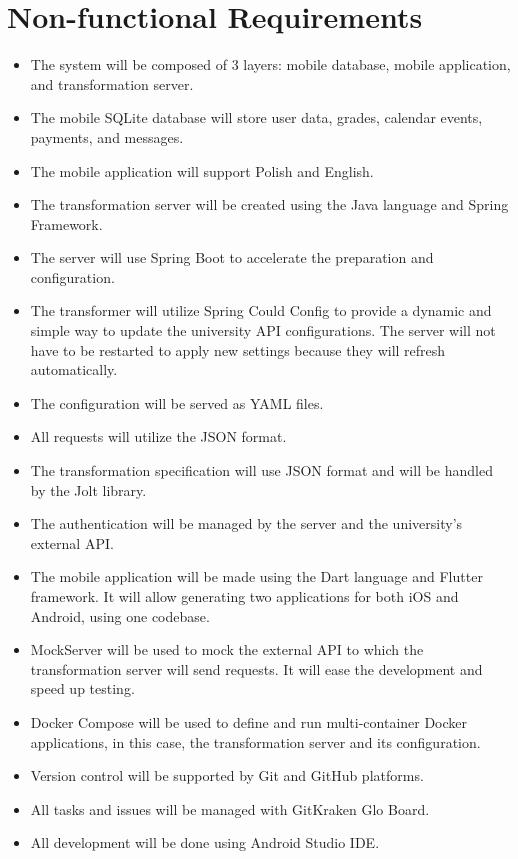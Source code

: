 \section{Non-functional Requirements}
\begin{itemize}
    \item The system will be composed of 3 layers: mobile database, mobile application, and transformation server.
    \item The mobile SQLite database will store user data, grades, calendar events, payments, and messages.
    \item The mobile application will support Polish and English.
    \item The transformation server will be created using the Java language and Spring Framework.
    \item The server will use Spring Boot to accelerate the preparation and configuration.
    \item The transformer will utilize Spring Could Config to provide a dynamic and simple way to update the university API configurations. The server will not have to be restarted to apply new settings because they will refresh automatically.
    \item The configuration will be served as YAML files.
    \item All requests will utilize the JSON format.
    \item The transformation specification will use JSON format and will be handled by the Jolt library.
    \item The authentication will be managed by the server and the university's external API.
    \item The mobile application will be made using the Dart language and Flutter framework. It will allow generating two applications for both iOS and Android, using one codebase.
    \item MockServer will be used to mock the external API to which the transformation server will send requests. It will ease the development and speed up testing.
    \item Docker Compose will be used to define and run multi-container Docker applications, in this case, the transformation server and its configuration.
    \item Version control will be supported by Git and GitHub platforms.
    \item All tasks and issues will be managed with GitKraken Glo Board.
    \item All development will be done using Android Studio IDE.
\end{itemize}

